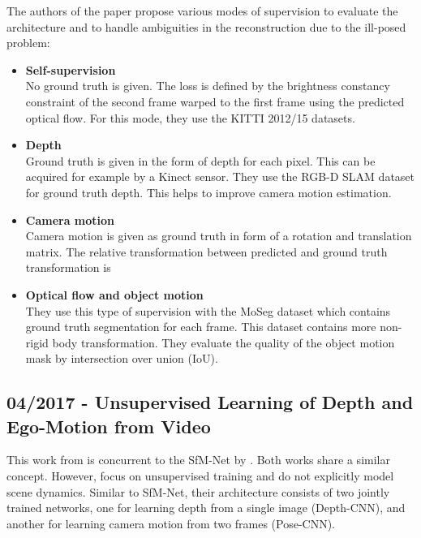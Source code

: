		The authors of the paper propose various modes of supervision to evaluate the architecture and to handle ambiguities in the reconstruction due to the ill-posed problem:
		\begin{itemize}
		\item \textbf{Self-supervision}
			\\
			No ground truth is given.
			The loss is defined by the brightness constancy constraint of the second frame warped to the first frame using the predicted optical flow.
			For this mode, they use the {KITTI} 2012/15 datasets.
		\item \textbf{Depth}
			\\
			Ground truth is given in the form of depth for each pixel.
			This can be acquired for example by a Kinect sensor.
			They use the {RGB-D SLAM} dataset for ground truth depth.
			This helps to improve camera motion estimation. 
		\item \textbf{Camera motion}
			\\
			Camera motion is given as ground truth in form of a rotation and translation matrix.
			The relative transformation between predicted and ground truth transformation is 
		\item \textbf{Optical flow and object motion}
			\\
			They use this type of supervision with the MoSeg dataset which contains ground truth segmentation for each frame.
			This dataset contains more non-rigid body transformation.
			They evaluate the quality of the object motion mask by intersection over union (IoU).
		\end{itemize}
		
	\subsection{04/2017 - Unsupervised Learning of Depth and Ego-Motion from Video}
		
		This work from \cite{zhou2017unsupervised} is concurrent to the SfM-Net by \cite{SFMNET}.
		Both works share a similar concept.
		However, \cite{zhou2017unsupervised} focus on unsupervised training and do not explicitly model scene dynamics.
		Similar to SfM-Net, their architecture consists of two jointly trained networks, one for learning depth from a single image (Depth-CNN), and another for learning camera motion from two frames (Pose-CNN).
		

